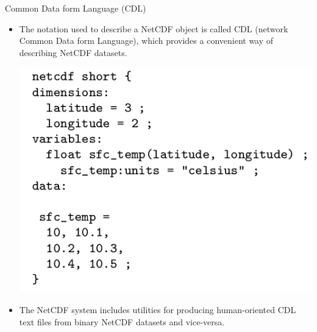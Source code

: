\documentclass[compress,11pt,xcolor=svgnames,aspectratio=169]{beamer}
\begin{document}
\begin{frame}[fragile]{Common Data form Language (CDL)}

\begin{itemize}
\setlength\itemsep{0.3cm}

\item The notation used to describe a NetCDF object is called CDL (network Common Data form Language), which provides a convenient way of describing NetCDF datasets.

\begin{center}
\includegraphics[scale=0.4]{fig/short-nc}\vspace{-0.2cm}
\end{center}

\item The NetCDF system includes utilities for producing human-oriented CDL text files from binary NetCDF datasets and vice-versa.

\end{itemize}

\end{frame}
\end{document}
